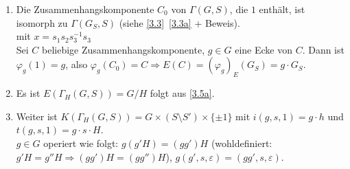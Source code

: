 \documentclass[a4paper, 10pt]{report}
\begin{document}
\begin{Bew}
\begin{enumerate}
  \item Die Zusammenhangskomponente $C_0$ von $\Gamma(G,S)$, die $1$ enthält,
  ist isomorph zu $\Gamma(G_S,S)$ (siehe \ref*{3.3}~\ref{3.3a} + Beweis).\\
  
  mit $x = s_1s_2s_3^{-1}s_3$\\
  Sei $C$ beliebige Zusammenhangskomponente, $g \in G$ eine Ecke von $C$.
  Dann ist $\varphi_g(1)=g$, also $\varphi_g(C_0) = C \Rightarrow E(C) = 
  (\varphi_g)_E(G_S) = g \cdot G_S$.
  \item Es ist $E(\Gamma_H(G,S))=G/H$ folgt aus \ref{3.5a}.\\
  \item Weiter ist $K(\Gamma_H(G,S)) = G \times (S \setminus S') \times
  \{\pm 1\}$ mit $i(g,s,1) = g \cdot h$ und $t(g,s,1)=g \cdot s \cdot
  H$.\\
  $g \in G$ operiert wie folgt: $g(g'H) = (gg')H$ (wohldefiniert: $g'H = g''H
  \Rightarrow (gg')H = (gg'')H$), $g(g',s,\varepsilon) = (gg', s , \varepsilon)$.
\end{enumerate}
\end{Bew}
\end{document}
